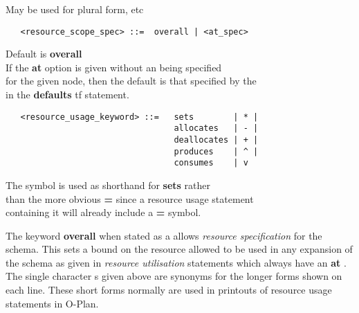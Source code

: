 \begin{flushright}
May be used for plural form, etc
\end{flushright}

\begin{verbatim}
   <resource_scope_spec> ::=  overall | <at_spec>
\end{verbatim}

\begin{flushright}
Default is {\bf overall} \\

If the {\bf at} option is given without an  being specified \\
for the given node, then the default is that specified by the \\
 in the {\bf defaults} {\sc tf} statement.
\end{flushright}

\begin{verbatim}
   <resource_usage_keyword> ::=   sets        | * |
                                  allocates   | - |
                                  deallocates | + |
                                  produces    | ^ |
                                  consumes    | v 
\end{verbatim}

\begin{flushright}
The {\bf *} symbol is used as shorthand for {\bf sets} rather \\
than the more obvious {\bf =} since a resource usage statement \\
containing it will already include a {\bf =} symbol.
\end{flushright}


The keyword {\bf overall} when stated as a  allows
{\em resource specification} for the schema.  This sets a bound on the
resource allowed to be used in any expansion of the schema as given in {\em
resource utilisation} statements which always have an {\bf at}
.  The single character s given
above are synonyms for the longer forms shown on each line.  These short forms
normally are used in printouts of resource usage statements in O-Plan.

